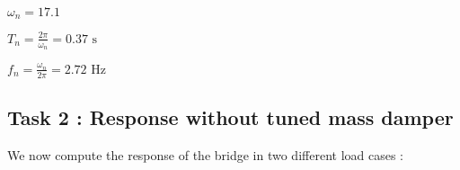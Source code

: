 \begin{Shaded}
\begin{Highlighting}[]
\OperatorTok{=}\OperatorTok{/}\OperatorTok{**}
\OperatorTok{=} \OperatorTok{*}\OperatorTok{/}
\OperatorTok{=}\OperatorTok{/} \OperatorTok{/}

\CharTok{\textbackslash{}\textbackslash{}}\SpecialCharTok{\{}\NormalTok{))}
\CharTok{\textbackslash{}\textbackslash{}}\CharTok{\{\{}\CharTok{\textbackslash{}\textbackslash{}}\CharTok{\{\{\textbackslash{}\textbackslash{}}\SpecialCharTok{\{}\SpecialStringTok{ }\CharTok{\textbackslash{}\textbackslash{}}\CharTok{\{\{}\NormalTok{))}
\CharTok{\textbackslash{}\textbackslash{}}\CharTok{\{\{\textbackslash{}\textbackslash{}}\CharTok{\{\{}\CharTok{\textbackslash{}\textbackslash{}}\SpecialCharTok{\{}\SpecialStringTok{ }\CharTok{\textbackslash{}\textbackslash{}}\CharTok{\{\{}\NormalTok{))}
\end{Highlighting}
\end{Shaded}

$\omega_n = 17.1$

$T_n = \frac{2\pi}{\omega_n} = 0.37 \text{ s} $

$f_n = \frac{\omega_n}{2\pi} = 2.72 \text{ Hz}$

\hypertarget{task-2--response-without-tuned-mass-damper}{%
\subsection{Task 2 : Response without tuned mass
damper}\label{task-2--response-without-tuned-mass-damper}}

We now compute the response of the bridge in two different load cases :

